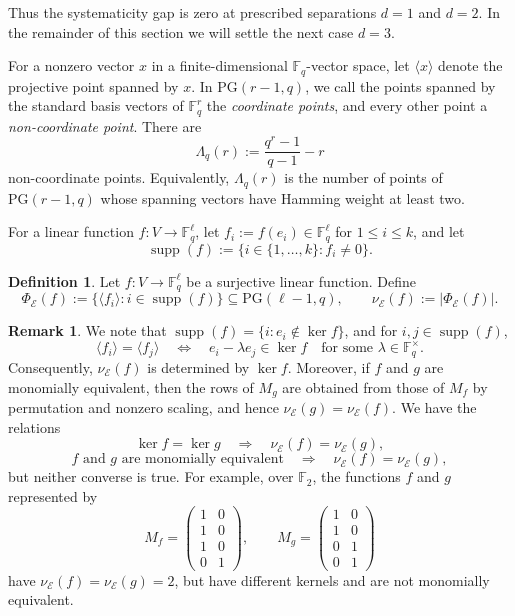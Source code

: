 \documentclass[a4paper,12pt]{article}
\theoremstyle{plain}
\theoremstyle{definition}
\newtheorem{definition}[lemma]{Definition}
\newtheorem{remark}[lemma]{Remark}
\newcommand{\F}{\mathbb F}
\begin{document}
Thus the systematicity gap is zero  at prescribed separations
$d=1$ and $d=2$. In the remainder of this section we will settle the next case $d=3$.


 
For a nonzero vector $x$ in a finite-dimensional $\F_q$-vector
space, let $\langle x\rangle$ denote the projective point spanned by
$x$. In $\mathrm{PG}(r-1,q)$, we call the points spanned by the
standard basis vectors of $\F_q^r$ the \emph{coordinate points},
and every other point a \emph{non-coordinate point}. There are
\[
\Lambda_q(r) := \frac{q^r-1}{q-1}-r
\]
non-coordinate points. 
Equivalently, $\Lambda_q(r)$ is the number of
points of $\mathrm{PG}(r-1,q)$ whose spanning vectors have
Hamming weight at least two.

For a linear function $f\colon V\to\F_q^\ell$, let
$f_i:=f(e_i)\in\F_q^\ell$ for $1\leq i\leq k$, and let
\[
\operatorname{supp}(f):=\{i\in\{1,\dots,k\}: f_i\neq0\}.
\]

\begin{definition}
\label{def:projective-coordinate-number}
Let $f\colon V\to\F_q^\ell$ be a surjective linear function. Define
\[
\Phi_{\mathcal E}(f)
:=
\{\langle f_i\rangle : i\in\operatorname{supp}(f)\}
\subseteq\mathrm{PG}(\ell-1,q),
\qquad
\nu_{\mathcal E}(f):=|\Phi_{\mathcal E}(f)|.
\]
\end{definition}

\begin{remark}
\label{rem:projective-coordinate-invariance}
We note that $ \operatorname{supp}(f)=\{i:e_i\notin\ker f\}$,
and  for $i,j\in\operatorname{supp}(f)$,
$$
\langle f_i\rangle=\langle f_j\rangle
\quad\Longleftrightarrow\quad
e_i-\lambda e_j\in\ker f
\quad\text{for some }\lambda\in\F_q^\times.
$$
Consequently, $\nu_{\mathcal E}(f)$ is determined by $\ker f$.
Moreover, if $f$ and $g$ are monomially equivalent, then the rows of
$M_g$ are obtained from those of $M_f$ by permutation and nonzero
scaling, and hence
$\nu_{\mathcal E}(g)=\nu_{\mathcal E}(f).$
We have the  relations
\[
\ker f=\ker g
\quad\Longrightarrow\quad
\nu_{\mathcal E}(f)=\nu_{\mathcal E}(g),
\]
\[
\text{$f$ and $g$ are monomially equivalent}
\quad\Longrightarrow\quad
\nu_{\mathcal E}(f)=\nu_{\mathcal E}(g),
\]
but neither converse is true. For example, over $\F_2$, the functions $f$ and $g$ represented by
\[
M_f=
\begin{pmatrix}
1&0\\1&0\\1&0\\0&1
\end{pmatrix},
\qquad
M_g=
\begin{pmatrix}
1&0\\1&0\\0&1\\0&1
\end{pmatrix}
\]
 have $\nu_{\mathcal E}(f)=\nu_{\mathcal E}(g)=2$, but have different kernels and are not monomially equivalent.
\end{remark}
\end{document}
